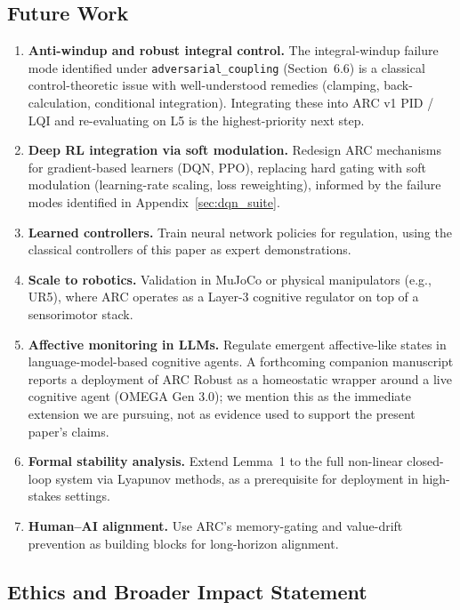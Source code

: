 \documentclass{article}
\begin{document}
\subsection{Future Work}\label{sec:future_work}

\begin{enumerate}
    \item \textbf{Anti-windup and robust integral control.} The integral-windup failure mode identified under \texttt{adversarial\_coupling} (Section~6.6) is a classical control-theoretic issue with well-understood remedies (clamping, back-calculation, conditional integration). Integrating these into ARC v1 PID / LQI and re-evaluating on L5 is the highest-priority next step.
    \item \textbf{Deep RL integration via soft modulation.} Redesign ARC mechanisms for gradient-based learners (DQN, PPO), replacing hard gating with soft modulation (learning-rate scaling, loss reweighting), informed by the failure modes identified in Appendix~\ref{sec:dqn_suite}.
    \item \textbf{Learned controllers.} Train neural network policies for regulation, using the classical controllers of this paper as expert demonstrations.
    \item \textbf{Scale to robotics.} Validation in MuJoCo or physical manipulators (e.g., UR5), where ARC operates as a Layer-3 cognitive regulator on top of a sensorimotor stack.
    \item \textbf{Affective monitoring in LLMs.} Regulate emergent affective-like states in language-model-based cognitive agents. A forthcoming companion manuscript \cite{Damian2026b} reports a deployment of ARC Robust as a homeostatic wrapper around a live cognitive agent (OMEGA Gen 3.0); we mention this as the immediate extension we are pursuing, not as evidence used to support the present paper's claims.
    \item \textbf{Formal stability analysis.} Extend Lemma~1 to the full non-linear closed-loop system via Lyapunov methods, as a prerequisite for deployment in high-stakes settings.
    \item \textbf{Human--AI alignment.} Use ARC's memory-gating and value-drift prevention as building blocks for long-horizon alignment.
\end{enumerate}

\subsection{Ethics and Broader Impact Statement}
\end{document}
